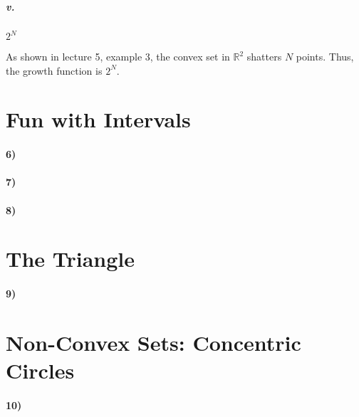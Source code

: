 \documentclass[10pt,letter]{article}
\begin{document}
	\subparagraph{v.} $2^N$

		As shown in lecture 5, example 3, the convex set in $\mathbb R^2$ shatters $N$ points. Thus, the growth function is $2^N$.

\section*{Fun with Intervals}

\paragraph{6)}

\paragraph{7)}

\paragraph{8)}

\section*{The Triangle}

\paragraph{9)}

\section*{Non-Convex Sets: Concentric Circles}

\paragraph{10)}
\end{document}
